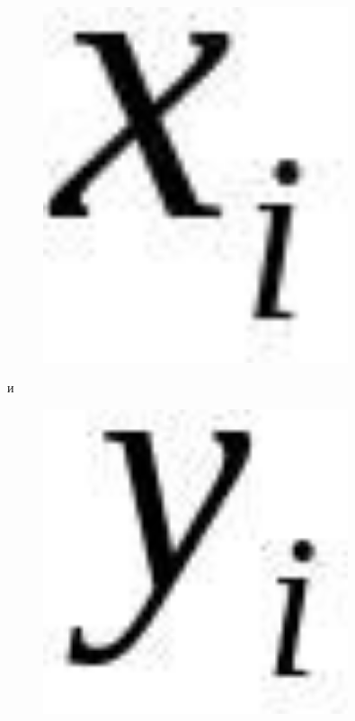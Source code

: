 \begin{figure}[H]
	\centering
	\includegraphics[width=0.8\textwidth]{assets/100}
	\caption*{}
\end{figure}и \begin{figure}[H]
	\centering
	\includegraphics[width=0.8\textwidth]{assets/101}
	\caption*{}
\end{figure}
